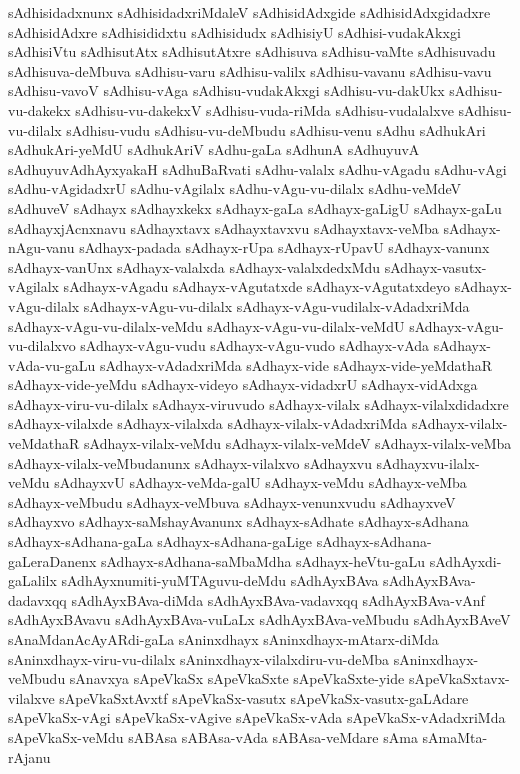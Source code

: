 {sAdhisidadxnunx
sAdhisidadxriMdaleV
sAdhisidAdxgide
sAdhisidAdxgidadxre
sAdhisidAdxre
sAdhisididxtu
sAdhisidudx
sAdhisiyU
sAdhisi-vudakAkxgi
sAdhisiVtu
sAdhisutAtx
sAdhisutAtxre
sAdhisuva
sAdhisu-vaMte
sAdhisuvadu
sAdhisuva-deMbuva
sAdhisu-varu
sAdhisu-valilx
sAdhisu-vavanu
sAdhisu-vavu
sAdhisu-vavoV
sAdhisu-vAga
sAdhisu-vudakAkxgi
sAdhisu-vu-dakUkx
sAdhisu-vu-dakekx
sAdhisu-vu-dakekxV
sAdhisu-vuda-riMda
sAdhisu-vudalalxve
sAdhisu-vu-dilalx
sAdhisu-vudu
sAdhisu-vu-deMbudu
sAdhisu-venu
sAdhu
sAdhukAri
sAdhukAri-yeMdU
sAdhukAriV
sAdhu-gaLa
sAdhunA
sAdhuyuvA
sAdhuyuvAdhAyxyakaH
sAdhuBaRvati
sAdhu-valalx
sAdhu-vAgadu
sAdhu-vAgi
sAdhu-vAgidadxrU
sAdhu-vAgilalx
sAdhu-vAgu-vu-dilalx
sAdhu-veMdeV
sAdhuveV
sAdhayx
sAdhayxkekx
sAdhayx-gaLa
sAdhayx-gaLigU
sAdhayx-gaLu
sAdhayxjAcnxnavu
sAdhayxtavx
sAdhayxtavxvu
sAdhayxtavx-veMba
sAdhayx-nAgu-vanu
sAdhayx-padada
sAdhayx-rUpa
sAdhayx-rUpavU
sAdhayx-vanunx
sAdhayx-vanUnx
sAdhayx-valalxda
sAdhayx-valalxdedxMdu
sAdhayx-vasutx-vAgilalx
sAdhayx-vAgadu
sAdhayx-vAgutatxde
sAdhayx-vAgutatxdeyo
sAdhayx-vAgu-dilalx
sAdhayx-vAgu-vu-dilalx
sAdhayx-vAgu-vudilalx-vAdadxriMda
sAdhayx-vAgu-vu-dilalx-veMdu
sAdhayx-vAgu-vu-dilalx-veMdU
sAdhayx-vAgu-vu-dilalxvo
sAdhayx-vAgu-vudu
sAdhayx-vAgu-vudo
sAdhayx-vAda
sAdhayx-vAda-vu-gaLu
sAdhayx-vAdadxriMda
sAdhayx-vide
sAdhayx-vide-yeMdathaR
sAdhayx-vide-yeMdu
sAdhayx-videyo
sAdhayx-vidadxrU
sAdhayx-vidAdxga
sAdhayx-viru-vu-dilalx
sAdhayx-viruvudo
sAdhayx-vilalx
sAdhayx-vilalxdidadxre
sAdhayx-vilalxde
sAdhayx-vilalxda
sAdhayx-vilalx-vAdadxriMda
sAdhayx-vilalx-veMdathaR
sAdhayx-vilalx-veMdu
sAdhayx-vilalx-veMdeV
sAdhayx-vilalx-veMba
sAdhayx-vilalx-veMbudanunx
sAdhayx-vilalxvo
sAdhayxvu
sAdhayxvu-ilalx-veMdu
sAdhayxvU
sAdhayx-veMda-galU
sAdhayx-veMdu
sAdhayx-veMba
sAdhayx-veMbudu
sAdhayx-veMbuva
sAdhayx-venunxvudu
sAdhayxveV
sAdhayxvo
sAdhayx-saMshayAvanunx
sAdhayx-sAdhate
sAdhayx-sAdhana
sAdhayx-sAdhana-gaLa
sAdhayx-sAdhana-gaLige
sAdhayx-sAdhana-gaLeraDanenx
sAdhayx-sAdhana-saMbaMdha
sAdhayx-heVtu-gaLu
sAdhAyxdi-gaLalilx
sAdhAyxnumiti-yuMTAguvu-deMdu
sAdhAyxBAva
sAdhAyxBAva-dadavxqq
sAdhAyxBAva-diMda
sAdhAyxBAva-vadavxqq
sAdhAyxBAva-vAnf
sAdhAyxBAvavu
sAdhAyxBAva-vuLaLx
sAdhAyxBAva-veMbudu
sAdhAyxBAveV
sAnaMdanAcAyARdi-gaLa
sAninxdhayx
sAninxdhayx-mAtarx-diMda
sAninxdhayx-viru-vu-dilalx
sAninxdhayx-vilalxdiru-vu-deMba
sAninxdhayx-veMbudu
sAnavxya
sApeVkaSx
sApeVkaSxte
sApeVkaSxte-yide
sApeVkaSxtavx-vilalxve
sApeVkaSxtAvxtf
sApeVkaSx-vasutx
sApeVkaSx-vasutx-gaLAdare
sApeVkaSx-vAgi
sApeVkaSx-vAgive
sApeVkaSx-vAda
sApeVkaSx-vAdadxriMda
sApeVkaSx-veMdu
sABAsa
sABAsa-vAda
sABAsa-veMdare
sAma
sAmaMta-rAjanu
}
